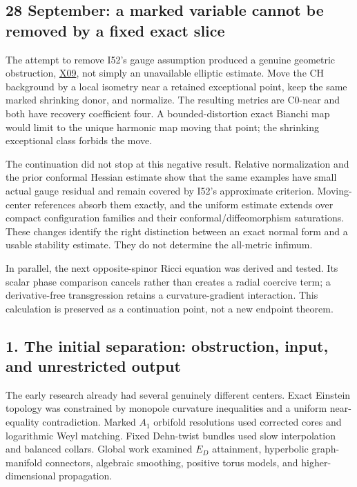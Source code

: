 \documentclass[
  10pt,
]{article}
\begin{document}
\hypertarget{september-a-marked-variable-cannot-be-removed-by-a-fixed-exact-slice}{%
\subsection{28 September: a marked variable cannot be removed by a fixed
exact
slice}\label{september-a-marked-variable-cannot-be-removed-by-a-fixed-exact-slice}}

The attempt to remove I52's gauge assumption produced a genuine
geometric obstruction,
\href{../continuation/20260928_marked_centers_and_harmonic_slices.md}{X09},
not simply an unavailable elliptic estimate. Move the CH background by a
local isometry near a retained exceptional point, keep the same marked
shrinking donor, and normalize. The resulting metrics are C0-near and
both have recovery coefficient four. A bounded-distortion exact Bianchi
map would limit to the unique harmonic map moving that point; the
shrinking exceptional class forbids the move.

The continuation did not stop at this negative result. Relative
normalization and the prior conformal Hessian estimate show that the
same examples have small actual gauge residual and remain covered by
I52's approximate criterion. Moving-center references absorb them
exactly, and the uniform estimate extends over compact configuration
families and their conformal/diffeomorphism saturations. These changes
identify the right distinction between an exact normal form and a usable
stability estimate. They do not determine the all-metric infimum.

In parallel, the next opposite-spinor Ricci equation was derived and
tested. Its scalar phase comparison cancels rather than creates a radial
coercive term; a derivative-free transgression retains a
curvature-gradient interaction. This calculation is preserved as a
continuation point, not a new endpoint theorem.

\hypertarget{the-initial-separation-obstruction-input-and-unrestricted-output}{%
\subsection{1. The initial separation: obstruction, input, and
unrestricted
output}\label{the-initial-separation-obstruction-input-and-unrestricted-output}}

The early research already had several genuinely different centers.
Exact Einstein topology was constrained by monopole curvature
inequalities and a uniform near-equality contradiction. Marked \(A_1\)
orbifold resolutions used corrected cores and logarithmic Weyl matching.
Fixed Dehn-twist bundles used slow interpolation and balanced collars.
Global work examined \(E_D\) attainment, hyperbolic graph-manifold
connectors, algebraic smoothing, positive torus models, and
higher-dimensional propagation.
\end{document}
